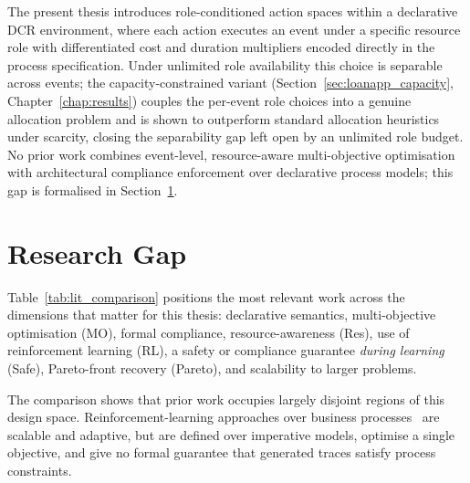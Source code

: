 The present thesis introduces role-conditioned action spaces within a
declarative \ac{DCR} environment, where each action executes an event
under a specific resource role with differentiated cost and duration
multipliers encoded directly in the process specification. Under
unlimited role availability this choice is separable across events; the
capacity-constrained variant
(Section~\ref{sec:loanapp_capacity}, Chapter~\ref{chap:results}) couples
the per-event role choices into a genuine allocation problem and is shown
to outperform standard allocation heuristics under scarcity, closing the
separability gap left open by an unlimited role budget. No prior work
combines event-level, resource-aware multi-objective optimisation with
architectural compliance enforcement over declarative process models;
this gap is formalised in Section~\ref{sec:research_gap}.

\section{Research Gap}
\label{sec:research_gap}

Table~\ref{tab:lit_comparison} positions the most relevant work across
the dimensions that matter for this thesis: declarative semantics,
multi-objective optimisation (MO), formal compliance, resource-awareness
(Res), use of reinforcement learning (RL), a safety or compliance
guarantee \emph{during learning} (Safe), Pareto-front recovery (Pareto),
and scalability to larger problems.


The comparison shows that prior work occupies largely disjoint regions
of this design space. Reinforcement-learning approaches over business
processes~\cite{Huang2011ReinforcementManagement,
Meneghello2024OptimizingLearning, Middelhuis2025LearningProcesses} are
scalable and adaptive, but are defined over imperative models, optimise
a single objective, and give no formal guarantee that generated traces
satisfy process constraints.

